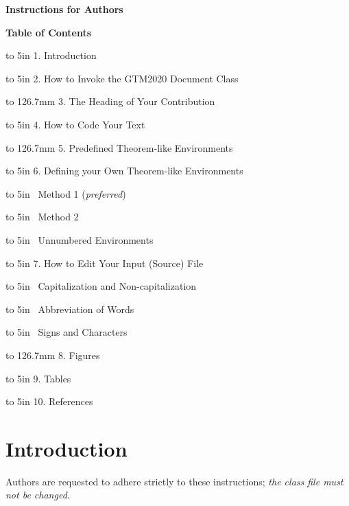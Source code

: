 \documentclass[citeauthoryear]{GTM2020}
\begin{document}
\setcounter{pp}{2}
\begin{center}
\LARGE\bfseries Instructions for Authors
\end{center}
\vskip20mm
\centerline{\Large\bf Table of Contents} \vskip10mm

\noindent\hbox to 5in {1. Introduction\dotfill {}}

\noindent\hbox to 5in {2. How to Invoke the GTM2020 Document
Class\dotfill {}}

\noindent\hbox to 126.7mm {3. The Heading of Your Contribution
\dotfill {}}
\addtocounter{pp}{2}

\noindent\hbox to 5in {4. How to Code Your Text \dotfill{}}

\noindent\hbox to 126.7mm {5. Predefined Theorem-like Environments\dotfill {}}
\addtocounter{pp}{1}

\noindent\hbox to 5in {6. Defining your Own Theorem-like Environments\dotfill {}}

\hbox to 5in { \ Method 1 ({\itshape preferred\/})\dotfill {}}
\addtocounter{pp}{1}

\hbox to 5in { \ Method 2 \dotfill {}}

\hbox to 5in { \ Unnumbered Environments\dotfill {}}

\noindent\hbox to 5in {7. How to Edit Your Input (Source) File\dotfill {}}

\hbox to 5in { \ Capitalization and Non-capitalization\dotfill {}}

\hbox to 5in { \ Abbreviation of Words\dotfill {}}
\addtocounter{pp}{1}

\hbox to 5in { \ Signs and Characters\dotfill {}}

\noindent\hbox to 126.7mm {8. Figures\dotfill {}}
\addtocounter{pp}{1}

\noindent\hbox to 5in {9. Tables\dotfill {}}

\noindent\hbox to 5in {10. References\dotfill {}}

\newpage
\section{Introduction}

Authors are requested to adhere strictly to these instructions;
{\em the class file must not be changed}.
\end{document}
